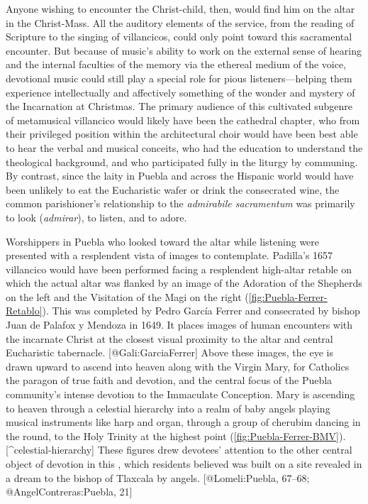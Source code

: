Anyone wishing to encounter the Christ-child, then, would find him on the altar
in the Christ-Mass.
All the auditory elements of the service, from the reading of Scripture to the
singing of villancicos, could only point toward this sacramental encounter.
But because of music's ability to work on the external sense of hearing and the
internal faculties of the memory via the ethereal medium of the voice,
devotional music could still play a special role for pious listeners---helping
them experience intellectually and affectively something of the wonder and
mystery of the Incarnation at Christmas.
The primary audience of this cultivated subgenre of metamusical villancico would
likely have been the cathedral chapter, who from their privileged position
within the architectural choir would have been best able to hear the verbal and
musical conceits, who had the education to understand the theological
background, and who participated fully in the liturgy by communing.
By contrast, since the laity in Puebla and across the Hispanic world would have
been unlikely to eat the Eucharistic wafer or drink the consecrated wine, the
common parishioner's relationship to the \emph{admirabile sacramentum} was primarily
to look (\emph{admirar}), to listen, and to adore.

Worshippers in Puebla who looked toward the altar while listening were presented
with a resplendent vista of images to contemplate.
Padilla's 1657 villancico would have been performed facing a resplendent
high-altar retable on which the actual altar was flanked by an image of the
Adoration of the Shepherds on the left and the Visitation of the Magi on the
right (\cref{fig:Puebla-Ferrer-Retablo}).
This  was completed by Pedro García Ferrer and consecrated
by bishop Juan de Palafox y Mendoza in 1649.
It places images of human encounters with the incarnate Christ at the closest
visual proximity to the altar and central Eucharistic tabernacle.
[@Gali:GarciaFerrer]
Above these images, the eye is drawn upward to ascend into heaven along with
the Virgin Mary, for Catholics the paragon of true faith and devotion, and the
central focus of the Puebla community's intense devotion to the Immaculate
Conception.
Mary is ascending to heaven through a celestial hierarchy  into a realm
of baby angels playing musical instruments like harp and organ, through a
group of cherubim dancing in the round, to the Holy Trinity at the highest
point (\cref{fig:Puebla-Ferrer-BMV}).[^celestial-hierarchy]
These figures drew devotees' attention to the other central object of devotion
in this , which residents believed was built on a site
revealed in a dream to the bishop of Tlaxcala by angels.
[@Lomeli:Puebla, 67--68; @AngelContreras:Puebla, 21]

